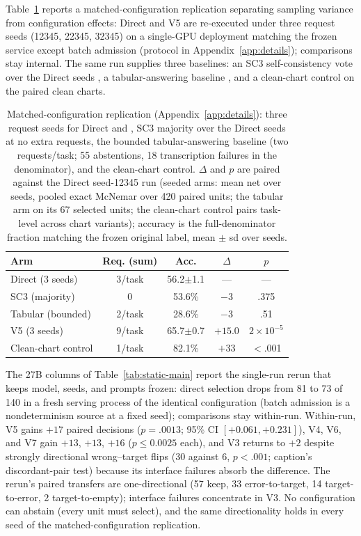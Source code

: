 Table~\ref{tab:static-seed} reports a
matched-configuration replication separating sampling
variance from configuration effects: Direct and V5 are re-executed under three request seeds
(12345, 22345, 32345) on a single-GPU deployment
matching the frozen service except batch admission
(protocol in Appendix~\ref{app:details}); comparisons stay internal.
The same run supplies three baselines: an SC3 self-consistency vote over the Direct seeds
\citep{wang2022selfconsistency}, a tabular-answering baseline \citep{tonglet2025protecting}, and a clean-chart control on the paired clean charts.

\begin{table}[t]
\centering
\setlength{\tabcolsep}{2pt}
\footnotesize
\begin{tabular}{lcccc}
\toprule
Arm & Req. (sum) & Acc. & $\Delta$ & $p$ \\
\midrule
Direct (3 seeds) & 3/task & 56.2$\pm$1.1 & --- & --- \\
SC3 (majority) & 0 & 53.6\% & $-3$ & .375 \\
Tabular (bounded) & 2/task & 28.6\% & $-3$ & .51 \\
\ours{} V5 (3 seeds) & 9/task & 65.7$\pm$0.7 & $+15.0$ & $2\times10^{-5}$ \\
Clean-chart control & 1/task & 82.1\% & $+33$ & $<$.001 \\
\bottomrule
\end{tabular}
\caption{Matched-configuration replication
(Appendix~\ref{app:details}): three request seeds for
Direct and \ours{}, SC3 majority over the Direct seeds
at no extra requests, the bounded tabular-answering
baseline (two requests/task; 55 abstentions, 18 transcription failures in the denominator), and the
clean-chart control. $\Delta$ and $p$ are paired against the Direct
seed-12345 run (seeded arms: mean net over seeds,
pooled exact McNemar over 420 paired units; the tabular arm on its 67 selected units; the clean-chart control pairs task-level across chart variants); accuracy is the full-denominator fraction
matching the frozen original label, mean $\pm$ sd over
seeds.}
\label{tab:static-seed}
\end{table}

The 27B columns of Table~\ref{tab:static-main} report the single-run rerun that keeps model, seeds, and prompts frozen: direct selection drops from 81 to 73 of 140 in a fresh serving process of the identical configuration (batch admission is a nondeterminism source at a fixed seed); comparisons stay within-run.
Within-run, V5 gains $+17$ paired decisions
($p=.0013$; 95\% CI $[+0.061, +0.231]$), V4, V6, and
V7 gain $+13$, $+13$, $+16$ ($p\leq0.0025$ each), and
V3 returns to $+2$ despite strongly directional
wrong--target flips (30 against 6, $p<.001$; caption's discordant-pair test) because its interface
failures absorb the difference.
The rerun's paired transfers are one-directional (57 keep, 33 error-to-target, 14 target-to-error, 2 target-to-empty); interface failures concentrate in V3. No configuration can abstain (every unit must select), and the same directionality holds in every seed of the matched-configuration replication.


